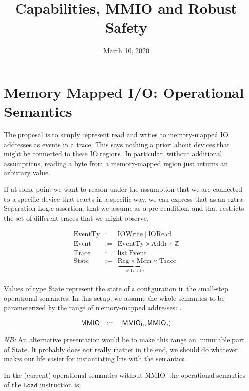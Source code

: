 \documentclass{article}
\title{Capabilities, MMIO and Robust Safety}
\date{March 10, 2020}
\newcommand{\Z}{\mathbb{Z}}
\newcommand{\X}[1]{\ensuremath{\mathrm{#1}}}
\newcommand{\I}[1]{\ensuremath{\mathtt{#1}}}
\newcommand{\SL}{Separation Logic\xspace}
\newcommand{\MMIO}{\textlog{MMIO}}
\begin{document}
\maketitle

\section{Memory Mapped I/O: Operational Semantics}

The proposal is to simply represent read and writes to memory-mapped IO
addresses as events in a trace. This says nothing a priori about devices that
might be connected to these IO regions. In particular, without additional
assumptions, reading a byte from a memory-mapped region just returns an
arbitrary value.

If at some point we want to reason under the assumption that we are connected to
a specific device that reacts in a specific way, we can express that as an extra
\SL assertion, that we assume as a pre-condition, and that restricts the set of
different traces that we might observe.

\[
  \begin{array}{lcl}
    \X{EventTy} & := & \X{IOWrite} \; | \; \X{IORead} \\
    \X{Event} & := & \X{EventTy} \times \X{Addr} \times \Z \\
    \X{Trace} & := & \X{list} \; \X{Event} \\
    \X{State} & := & \underbrace{\X{Reg} \times \X{Mem}}_{\text{old state}}
                     \times \X{Trace} \\
  \end{array}
\]

Values of type \X{State} represent the state of a configuration in the
small-step operational semantics. In this setup, we assume the whole semantics
to be parameterized by the range of memory-mapped addresses: \MMIO.

\[
  \begin{array}{lcl}
    \MMIO & := & [\MMIO_{\X{b}}, \MMIO_{\X{e}}) \\
  \end{array}
\]

\textit{NB:} An alternative presentation would be to make this range an
immutable part of \X{State}. It probably does not really matter in the end, we
should do whatever makes our life easier for instantiating Iris with the
semantics.

In the (current) operational semantics without MMIO, the operational semantics
of the \I{Load} instruction is:
\end{document}
